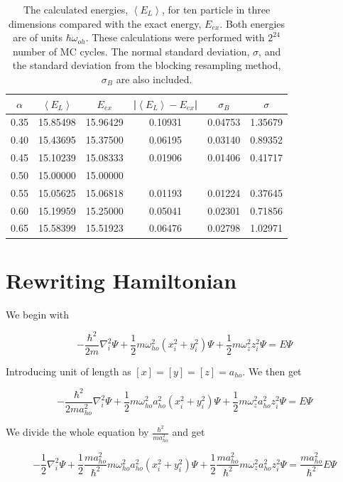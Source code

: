 \begin{table}[H]\caption{The calculated energies, $\left<E_L\right>$, for ten particle in three dimensions compared with the exact energy, $E_{ex}$. Both energies are of units $\hbar\omega_{oh}$. These calculations were performed with $2^{24}$ number of MC cycles. The normal standard deviation, $\sigma$, and the standard deviation from the blocking resampling method, $\sigma_B$ are also included.}\label{tab:brute_force_N_10_MC_boost}
\center
\begin{tabular}{cccccc}
$\alpha$ & $\left< E_L \right>$ & $E_{ex}$ & |$\left< E_L \right>-E_{ex}$|  & $\sigma_B$ & $\sigma$\\ \hline
0.35 & 15.85498 & 15.96429 & 0.10931 & 0.04753 & 1.35679\\
0.40 & 15.43695 & 15.37500 & 0.06195 & 0.03140 & 0.89352\\
0.45 & 15.10239 & 15.08333 & 0.01906 & 0.01406 & 0.41717\\
0.50 & 15.00000 & 15.00000 &                &                &                \\
0.55 & 15.05625 & 15.06818 & 0.01193 & 0.01224 & 0.37645\\
0.60 & 15.19959 & 15.25000 & 0.05041 & 0.02301 & 0.71856\\
0.65 & 15.58399 & 15.51923 & 0.06476 & 0.02798 & 1.02971\\
\end{tabular}
\end{table} 

\section{Rewriting Hamiltonian}\label{app:new_Hamiltonian}

We begin with

$$-\frac{\hbar^2}{2m} \nabla_i^2 \Psi + \frac{1}{2}m \omega_{ho}^2 \left( x_i^2 + y_i^2\right)\Psi + \frac{1}{2}m\omega_z^2 z_i^2\Psi = E \Psi $$

Introducing unit of length as $[x]=[y]=[z] = a_{ho}$. We then get

$$-\frac{\hbar^2}{2ma_{ho}^2} \nabla_i^2 \Psi + \frac{1}{2}m \omega_{ho}^2 a_{ho}^2\left( x_i^2 + y_i^2\right)\Psi + \frac{1}{2}m\omega_z^2a_{ho}^2 z_i^2\Psi = E \Psi $$

We divide the whole equation by $\frac{\hbar^2}{ma_{ho}^2}$ and get

$$-\frac{1}{2} \nabla_i^2 \Psi + \frac{1}{2}\frac{ma_{ho}^2}{\hbar^2}m \omega_{ho}^2 a_{ho}^2\left( x_i^2 + y_i^2\right)\Psi + \frac{1}{2}\frac{ma_{ho}^2}{\hbar^2}m\omega_z^2a_{ho}^2 z_i^2\Psi = \frac{ma_{ho}^2}{\hbar^2}E \Psi $$

